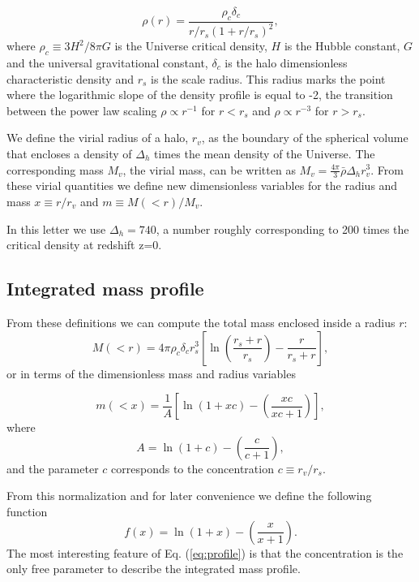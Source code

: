 \documentclass{emulateapj}
\begin{document}
\begin{equation}
\rho(r) = \frac{\rho_c\delta_c}{r/r_s(1+r/r_s)^2},
\label{eq:definition}
\end{equation}
%
where $\rho_c\equiv 3H^2/8\pi G$ is the Universe critical density, $H$
is the Hubble constant, $G$ and the universal gravitational constant,
$\delta_c$ is the halo dimensionless characteristic density and $r_s$
is the scale radius.  This radius marks the point where the
logarithmic slope of the density profile is equal to -2, the
transition between the power law scaling $\rho\propto r^{-1}$ for
$r<r_s$ and $\rho\propto r^{-3}$ for $r>r_s$.

We define the virial radius of a halo, $r_v$, as the boundary of the
spherical volume that encloses a density of $\Delta_h$ times the mean
density of the Universe.  The corresponding mass $M_{v}$, the virial
mass, can be written as $M_{v} = \frac{4\pi}{3}\bar{\rho}\Delta_h
r_v^3$.  From these virial quantities we define new dimensionless
variables for the radius and mass $x\equiv r/r_v$ and $m\equiv
M(<r)/M_v$.

In this letter we use $\Delta_h=740$, a number roughly corresponding to
200 times the critical density at redshift z=0. 


\subsection{Integrated mass profile}

From these definitions we can compute the total mass enclosed inside a
radius $r$:
\begin{equation}
M(<r) = 4\pi\rho_c\delta_c  r_s^3\left[\ln \left
  (\frac{r_s+r}{r_s}\right) - \frac{r}{r_s+r}\right],
\end{equation}
%
or in terms of the dimensionless mass and radius variables

\begin{equation}
m(<x) =
\frac{1}{A}\left[\ln\left(1+xc\right)-\left(\frac{xc}{xc+1}\right)\right],
\label{eq:profile}
\end{equation}
%
where
%
\begin{equation}
A=\ln\left(1+c\right)-\left(\frac{c}{c+1}\right),
\end{equation}
%
and the parameter $c$ corresponds to the concentration $c\equiv
r_v/r_s$.

From this normalization and for later convenience we define the
following function
%
\begin{equation}
f(x) = \ln\left(1+x\right)-\left(\frac{x}{x+1}\right).
\label{eq:f_NFW}
\end{equation}
%
The most interesting feature of Eq. (\ref{eq:profile}) is that the
concentration is the only free parameter to describe the integrated
mass profile.
\end{document}
